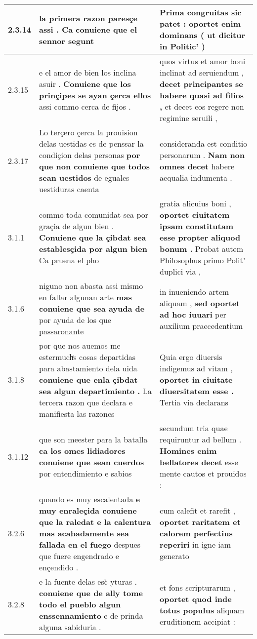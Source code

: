 \begin{tabular}{|p{1cm}|p{6.5cm}|p{6.5cm}|}
2.3.14 & la primera razon paresçe assi . \textbf{ Ca conuiene que el sennor } segunt & Prima congruitas sic patet : \textbf{ oportet enim dominans } ( ut dicitur in Politic’ ) \\\hline
2.3.15 & e el amor de bien los inclina asuir . \textbf{ Conuiene que los prinçipes se ayan çerca ellos } assi commo cerca de fijos . & quos virtus et amor boni inclinat ad seruiendum , \textbf{ decet principantes se habere quasi ad filios , } et decet eos regere non regimine seruili , \\\hline
2.3.17 & Lo terçero çerca la prouision delas uestidas es de penssar la condiçion delas personas \textbf{ por que non conuiene que todos sean uestidos } de eguales uestiduras caenta & consideranda est conditio personarum . \textbf{ Nam non omnes decet } habere aequalia indumenta . \\\hline
3.1.1 & commo toda comunidat sea por graçia de algun bien . \textbf{ Conuiene que la çibdat sea establesçida por algun bien } Ca pruena el pho & gratia alicuius boni , \textbf{ oportet ciuitatem ipsam constitutam esse propter aliquod bonum . } Probat autem Philosophus primo Polit’ duplici via , \\\hline
3.1.6 & niguno non abasta assi mismo en fallar algunan arte \textbf{ mas conuiene que sea ayuda de } por ayuda de los que passaronante & in inueniendo artem aliquam , \textbf{ sed oportet ad hoc iuuari } per auxilium praecedentium \\\hline
3.1.8 & por que nos auemos me estermuchͣs cosas departidas para abastamiento dela uida \textbf{ conuiene que enla çibdat sea algun departimiento . } La tercera razon que declara e manifiesta las razones & Quia ergo diuersis indigemus ad vitam , \textbf{ oportet in ciuitate diuersitatem esse . } Tertia via declarans \\\hline
3.1.12 & que son meester para la batalla \textbf{ ca los omes lidiadores conuiene que sean cuerdos } por entendimiento e sabios & secundum tria quae requiruntur ad bellum . \textbf{ Homines enim bellatores decet } esse mente cautos et prouidos : \\\hline
3.2.6 & quando es muy escalentada \textbf{ e muy enraleçida conuiene que la raledat e la calentura mas acabadamente sea fallada en el fuego } despues que fuere engendrado e ençendido . & cum calefit et rarefit , \textbf{ oportet raritatem et calorem perfectius reperiri } in igne iam generato \\\hline
3.2.8 & e la fuente delas esc̀ yturas . \textbf{ conuiene que de ally tome todo el pueblo algun enssennamiento } e de prinda alguna sabiduria . & et fons scripturarum , \textbf{ oportet quod inde totus populus } aliquam eruditionem accipiat : \\\hline

\end{tabular}
